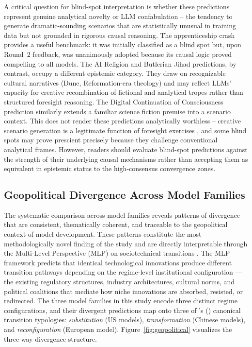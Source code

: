 \documentclass[preprint,review,12pt]{elsarticle}
\begin{document}
A critical question for blind-spot interpretation is whether these predictions represent genuine analytical novelty or LLM confabulation -- the tendency to generate dramatic-sounding scenarios that are statistically unusual in training data but not grounded in rigorous causal reasoning. The apprenticeship crash provides a useful benchmark: it was initially classified as a blind spot but, upon Round~2 feedback, was unanimously adopted because its causal logic proved compelling to all models. The AI Religion and Butlerian Jihad predictions, by contrast, occupy a different epistemic category. They draw on recognizable cultural narratives (Dune, Reformation-era theology) and may reflect LLMs' capacity for creative recombination of fictional and analytical tropes rather than structured foresight reasoning. The Digital Continuation of Consciousness prediction similarly extends a familiar science fiction premise into a scenario context. This does not render these predictions analytically worthless -- creative scenario generation is a legitimate function of foresight exercises \citep{postma2005scenario}, and some blind spots may prove prescient precisely because they challenge conventional analytical frames. However, readers should evaluate blind-spot predictions against the strength of their underlying causal mechanisms rather than accepting them as equivalent in epistemic status to the high-consensus convergence zones.

\subsection{Geopolitical Divergence Across Model Families}
\label{sec:geopolitical_divergence}

The systematic comparison across model families reveals patterns of divergence that are consistent, thematically coherent, and traceable to the geopolitical context of model development. These patterns constitute the most methodologically novel finding of the study and are directly interpretable through the Multi-Level Perspective (MLP) on sociotechnical transitions \citep{geels2005coevolutionary, geels2020microfoundations}. The MLP framework predicts that identical technological innovations produce different transition pathways depending on the regime-level institutional configuration --- the existing regulatory structures, industry architectures, cultural norms, and political coalitions that mediate how niche innovations are absorbed, resisted, or redirected. The three model families in this study encode three distinct regime configurations, and their divergent predictions map onto three of \citeauthor{geels2005coevolutionary}'s (\citeyear{geels2005coevolutionary}) canonical transition typologies: \textit{substitution} (US models), \textit{transformation} (Chinese models), and \textit{reconfiguration} (European model). Figure~\ref{fig:geopolitical} visualizes the three-way divergence structure.
\end{document}

